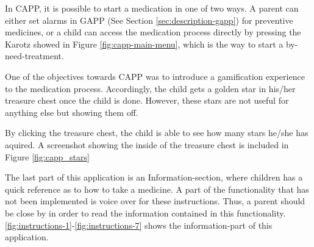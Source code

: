 In CAPP, it is possible to start a medication in one of two ways. A parent can either set alarms in GAPP (See Section \ref{sec:description-gapp}) for preventive medicines, or a child can access the medication process directly by pressing the Karotz showed in Figure \ref{fig:capp-main-menu}, which is the way to start a by-need-treatment. 


One of the objectives towards CAPP was to introduce a gamification experience to the medication process. Accordingly, the child gets a golden star in his/her treasure chest once the child is done. However, these stars are not useful for anything else but showing them off.
  

By clicking the treasure chest, the child is able to see how many stars he/she has aquired. A screenshot showing the inside of the treasure chest is included in Figure \ref{fig:capp_stars} 


The last part of this application is an Information-section, where children has a quick reference as to how to take a medicine. A part of the functionality that has not been implemented is voice over for these instructions. Thus, a parent should be close by in order to read the information contained in this functionality.     
\ref{fig:instructions-1}-\ref{fig:instructions-7} shows the information-part of this application.



